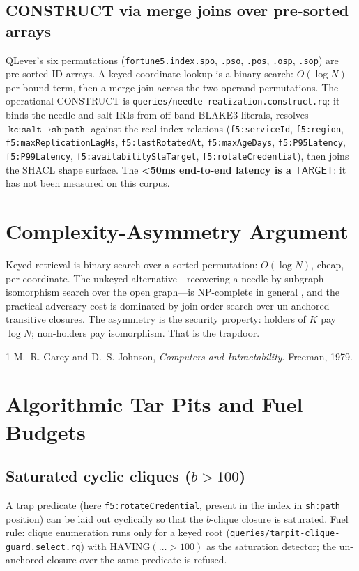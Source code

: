 \documentclass[11pt]{article}
\newcommand{\TARGET}{\textsf{TARGET}}
\begin{document}
\subsection{CONSTRUCT via merge joins over pre-sorted arrays}
QLever's six permutations (\texttt{fortune5.index.spo}, \texttt{.pso},
\texttt{.pos}, \texttt{.osp}, \texttt{.sop}) are pre-sorted ID arrays.
A keyed coordinate lookup is a binary search: $O(\log N)$ per bound term,
then a merge join across the two operand permutations. The operational
CONSTRUCT is \texttt{queries/needle-realization.construct.rq}: it binds
the needle and salt IRIs from off-band BLAKE3 literals, resolves
$\texttt{kc:salt} \rightarrow \texttt{sh:path}$ against the real index
relations (\texttt{f5:serviceId}, \texttt{f5:region},
\texttt{f5:maxReplicationLagMs}, \texttt{f5:lastRotatedAt},
\texttt{f5:maxAgeDays}, \texttt{f5:P95Latency}, \texttt{f5:P99Latency},
\texttt{f5:availabilitySlaTarget}, \texttt{f5:rotateCredential}), then
joins the SHACL shape surface. The \textbf{<50ms end-to-end latency is a
$\TARGET$}: it has not been measured on this corpus.

\section{Complexity-Asymmetry Argument}

Keyed retrieval is binary search over a sorted permutation:
$O(\log N)$, cheap, per-coordinate. The unkeyed alternative---recovering a
needle by subgraph-isomorphism search over the open graph---is
NP-complete in general \cite{gareyjohnson79}, and the practical adversary
cost is dominated by join-order search over un-anchored transitive
closures. The asymmetry is the security property: holders of $K$ pay
$\log N$; non-holders pay isomorphism. That is the trapdoor.

\begin{thebibliography}{1}
 M.~R. Garey and D.~S. Johnson,
\emph{Computers and Intractability}. Freeman, 1979.
\end{thebibliography}

\section{Algorithmic Tar Pits and Fuel Budgets}
\label{sec:tarpits}

\subsection{Saturated cyclic cliques ($b > 100$)}
A trap predicate (here \texttt{f5:rotateCredential}, present in the index
in \texttt{sh:path} position) can be laid out cyclically so that the
$b$-clique closure is saturated. Fuel rule: clique enumeration runs only
for a keyed root (\texttt{queries/tarpit-clique-guard.select.rq}) with
$\mathrm{HAVING}(\ldots > 100)$ as the saturation detector; the
un-anchored closure over the same predicate is refused.
\end{document}
